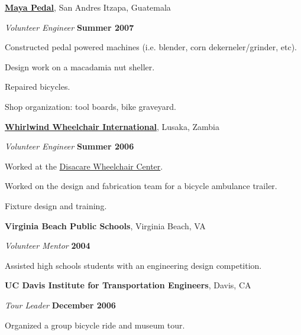 \documentclass[10pt]{article}
\newenvironment{outerlist}[1][\enskip\textbullet]%
        {\begin{itemize}[#1]}{\end{itemize}%
         \vspace{-.6\baselineskip}}
\newenvironment{innerlist}[1][\enskip\textbullet]%
        {\begin{compactitem}[#1]}{\end{compactitem}}
\newcommand{\blankline}{\quad\pagebreak[2]}
\begin{document}
\href{http://www.mayapedal.org/}{\textbf{Maya Pedal}}, San Andres Itzapa, Guatemala
\begin{outerlist}
  \item[] \textit{Volunteer Engineer}%
    \hfill \textbf{Summer 2007}
  \begin{innerlist}
    \item Constructed pedal powered machines (i.e. blender, corn
      dekerneler/grinder, etc).
    \item Design work on a macadamia nut sheller.
    \item Repaired bicycles.
    \item Shop organization: tool boards, bike graveyard.
  \end{innerlist}
\end{outerlist}

\blankline

\href{http://www.whirlwindwheelchair.org/}{\textbf{Whirlwind Wheelchair
International}}, Lusaka, Zambia
\begin{outerlist}
  \item[] \textit{Volunteer Engineer}%
    \hfill \textbf{Summer 2006}
  \begin{innerlist}
    \item Worked at the \href{http://www.disacare.org.zm/}{Disacare Wheelchair
      Center}.
    \item Worked on the design and fabrication team for a bicycle ambulance
      trailer.
    \item Fixture design and training.
  \end{innerlist}
\end{outerlist}

\blankline

{\textbf{Virginia Beach Public Schools}}, Virginia Beach, VA
\begin{outerlist}
  \item[] \textit{Volunteer Mentor}%
    \hfill \textbf{2004}
  \begin{innerlist}
    \item Assisted high schools students with an engineering design competition.
  \end{innerlist}
\end{outerlist}

\blankline

{\textbf{UC Davis Institute for Transportation Engineers}}, Davis, CA
\begin{outerlist}
  \item[] \textit{Tour Leader}%
    \hfill \textbf{December 2006}
  \begin{innerlist}
    \item Organized a group bicycle ride and museum tour.
  \end{innerlist}
\end{outerlist}
\end{document}
